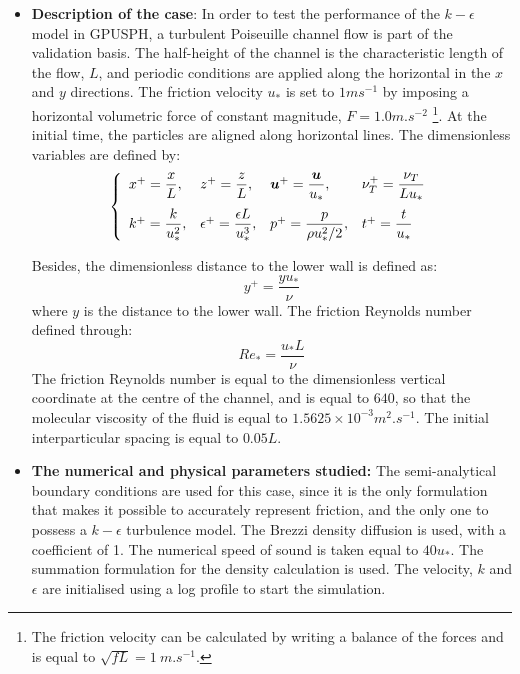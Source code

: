 \documentclass{../GPUSPHtemplate}
\begin{document}
\begin{itemize}
\item \textbf{Description of the case}: 
  In order to test the performance of the $k-\epsilon$ model in GPUSPH, a turbulent Poiseuille channel flow is part of the validation basis. 
  The half-height of the channel is the characteristic length of the flow, $L$, and periodic conditions are applied along the horizontal in the $x$ and $y$ directions.
  The friction velocity $u_*$ is set to $1ms^{-1}$ by imposing a horizontal volumetric force of constant magnitude, $F = 1.0 m.s^ {-2}$%
  \footnote{The friction velocity can be calculated by writing a balance of the forces and is equal to $\sqrt{f L}=1~m.s^{-1}$.}.
  At the initial time, the particles are aligned along horizontal lines.
  The dimensionless variables are defined by:
  \begin{equation}\label{eq:dimensionlessVariables}
    \left\{
    \begin{array}{llll}
      x^+=\dfrac{x}{L}, & z^+=\dfrac{z}{L}, & \vec{u}^+=\dfrac{\vec u}{u_*}, & \nu_T^+=\dfrac{\nu_T}{L u_*}\medskip \\
      k^+=\dfrac{k}{u_*^2}, & \epsilon^+=\dfrac{\epsilon L}{u_*^3}, & p^+=\dfrac{p}{\rho u_*^2/2}, & t^+ = \dfrac{t}{u_*}
    \end{array}
    \right.
\end{equation}

  Besides, the dimensionless distance to the lower wall is defined as: 
  \begin{equation}
    y^+=\dfrac{y u_*}{\nu}
  \end{equation}
  where $y$ is the distance to the lower wall. The friction Reynolds number defined through:
  \begin{equation}
    Re_*=\dfrac{u_* L}{\nu}
  \end{equation}
  The friction Reynolds number is equal to the dimensionless vertical coordinate at the centre of the channel,
  and is equal to $640$, so that the molecular viscosity of the fluid is equal to $1.5625 \times 10^{-3}m^2.s^{-1}$. 
  The initial interparticular spacing is equal to $0.05L$. \\
  
\item \textbf{The numerical and physical parameters studied:} 
  The semi-analytical boundary conditions are used for this case, since it is the only formulation
  that makes it possible to accurately represent friction, and the only one to possess a $k-\epsilon$ turbulence
  model. The Brezzi density diffusion is used, with a coefficient of 1. The numerical speed of sound is taken equal
  to $40u_*$. The summation formulation for the density calculation is used. The velocity, $k$ and $\epsilon$
  are initialised using a log profile to start the simulation.
\end{itemize}
\end{document}
